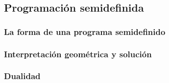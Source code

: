 \subsection{Programación semidefinida} %
\label{sub:programacion_semidefinida}

\subsubsection{La forma de una programa semidefinido} %
\label{ssub:la_forma_de_una_programa_semidefinido}

\subsubsection{Interpretación geométrica y solución} %
\label{ssub:interpretacion_geometrica_y_solucion}

\subsubsection{Dualidad} %
\label{ssub:dualidad}